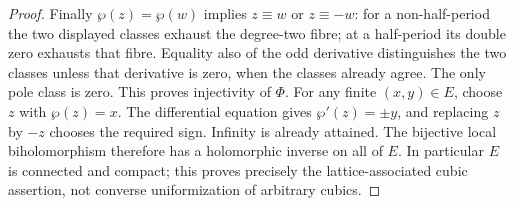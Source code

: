 \documentclass[11pt,a4paper,openany]{book}
\theoremstyle{definition}
\theoremstyle{remark}\newtheorem{remark}[theorem]{Remark}
\begin{document}
\begin{proof}
Finally $\wp(z)=\wp(w)$ implies $z\equiv w$ or $z\equiv-w$:
for a non-half-period the two displayed classes exhaust the degree-two
fibre; at a half-period its double zero exhausts that fibre. Equality
also of the odd derivative distinguishes the two classes unless that
derivative is zero, when the classes already agree. The only pole
class is zero. This proves injectivity of $\Phi$. For any finite
$(x,y)\in E$, choose $z$ with $\wp(z)=x$. The differential equation
gives $\wp'(z)=\pm y$, and replacing $z$ by $-z$ chooses the required
sign. Infinity is already attained. The bijective local biholomorphism
therefore has a holomorphic inverse on all of $E$. In particular $E$
is connected and compact; this proves precisely the lattice-associated
cubic assertion, not converse uniformization of arbitrary cubics.
\end{proof}
\end{document}
